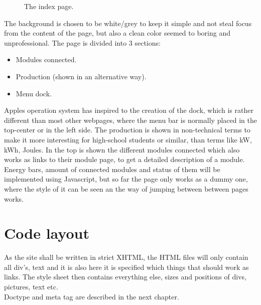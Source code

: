 \begin{figure}[h!]
	\center
		\setlength\fboxsep{0pt}
		\setlength\fboxrule{1pt}
   	\caption{The index page.}
   	\label{fig:index_page_design}
\end{figure}
The background is chosen to be white/grey to keep it simple and not steal focus from the content of the page, but also a clean color seemed to boring and unprofessional. 
\newpage The page is divided into 3 sections:
\begin{itemize}
	\item Modules connected.
	\item Production (shown in an alternative way).
	\item Menu dock.
\end{itemize}
Apples operation system has inspired to the creation of the dock, which is rather different than most other webpages, where the menu bar is normally placed in the top-center or in the left side. The production is shown in non-technical terms to make it more interesting for high-school students or similar, than terms like kW, kWh, Joules. In the top is shown the different modules connected which also works as links to their module page, to get a detailed description of a module. Energy bars, amount of connected modules and status of them will be implemented using Javascript, but so far the page only works as a dummy one, where the style of it can be seen an the way of jumping between between pages works.  
\section{Code layout}
As the site shall be written in strict XHTML, the HTML files will only contain all div's, text and it is also here it is specified which things that should work as links. The style sheet then contains everything else, sizes and positions of divs, pictures, text etc.
\\Doctype and meta tag are described in the next chapter.

